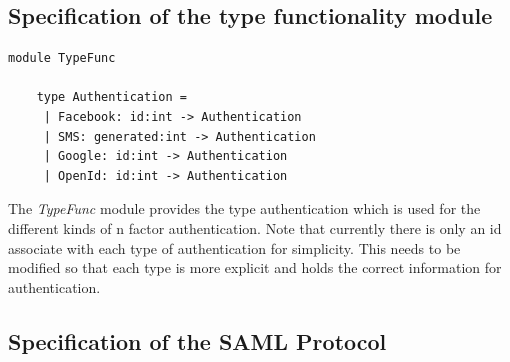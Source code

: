 \documentclass[twosided]{report}
\begin{document}
\subsection{Specification of the type functionality module}
\begin{lstlisting}[style=fstar, caption={TypeFunc module}]
	module TypeFunc

	type Authentication =
 	 | Facebook: id:int -> Authentication
 	 | SMS: generated:int -> Authentication
	 | Google: id:int -> Authentication
	 | OpenId: id:int -> Authentication
\end{lstlisting}

The \emph{TypeFunc} module provides the type authentication which is used for the different kinds of n factor authentication. Note that currently there is only an id associate with each type of authentication for simplicity. This needs to be modified so that each type is more explicit and holds the correct information for authentication.
\subsection{Specification of the SAML Protocol}
\end{document}
